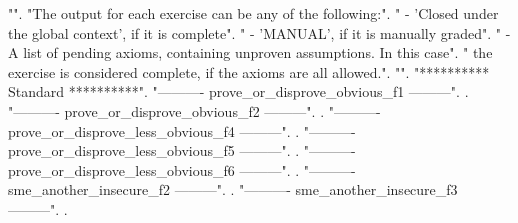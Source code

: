 \documentclass[12pt]{report}
\begin{document}
\begin{coqdoccode}
\coqdocnoindent
{} "".\coqdoceol
\coqdocnoindent
{} "The output for each exercise can be any of the following:".\coqdoceol
\coqdocnoindent
{} "  - 'Closed under the global context', if it is complete".\coqdoceol
\coqdocnoindent
{} "  - 'MANUAL', if it is manually graded".\coqdoceol
\coqdocnoindent
{} "  - A list of pending axioms, containing unproven assumptions. In this case".\coqdoceol
\coqdocnoindent
{} "    the exercise is considered complete, if the axioms are all allowed.".\coqdoceol
\coqdocnoindent
{} "".\coqdoceol
\coqdocnoindent
{} "********** Standard **********".\coqdoceol
\coqdocnoindent
{} "---------- prove\_or\_disprove\_obvious\_f1 ---------".\coqdoceol
\coqdocnoindent
{}  .\coqdoceol
\coqdocnoindent
{} "---------- prove\_or\_disprove\_obvious\_f2 ---------".\coqdoceol
\coqdocnoindent
{}  .\coqdoceol
\coqdocnoindent
{} "---------- prove\_or\_disprove\_less\_obvious\_f4 ---------".\coqdoceol
\coqdocnoindent
{}  .\coqdoceol
\coqdocnoindent
{} "---------- prove\_or\_disprove\_less\_obvious\_f5 ---------".\coqdoceol
\coqdocnoindent
{}  .\coqdoceol
\coqdocnoindent
{} "---------- prove\_or\_disprove\_less\_obvious\_f6 ---------".\coqdoceol
\coqdocnoindent
{}  .\coqdoceol
\coqdocnoindent
{} "---------- sme\_another\_insecure\_f2 ---------".\coqdoceol
\coqdocnoindent
{}  .\coqdoceol
\coqdocnoindent
{} "---------- sme\_another\_insecure\_f3 ---------".\coqdoceol
\coqdocnoindent
{}  .\coqdoceol

\end{coqdoccode}
\end{document}
